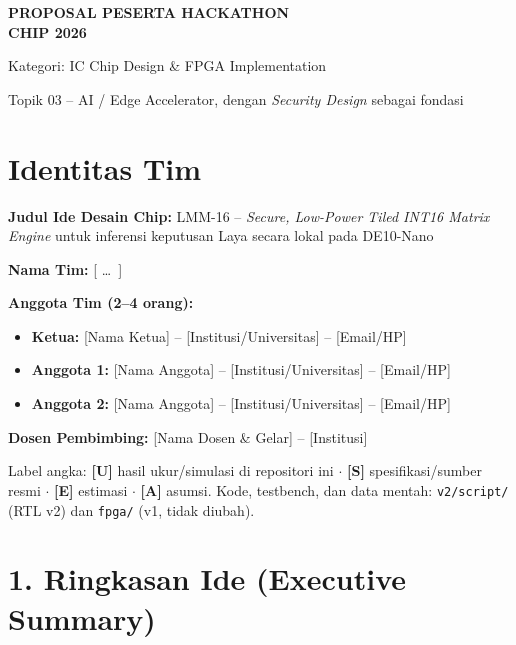 \documentclass[10pt]{article}
\begin{document}
{\fontsize{25}{29}\selectfont\bfseries PROPOSAL PESERTA HACKATHON\\ CHIP 2026\par}
\vspace{1mm}
{\color{mut}\Large Kategori: IC Chip Design \& FPGA Implementation\par}
{\color{mut}\small Topik 03 -- AI / Edge Accelerator, dengan \emph{Security Design} sebagai fondasi\par}

\section*{Identitas Tim}
\textbf{Judul Ide Desain Chip:} LMM-16 -- \emph{Secure, Low-Power Tiled INT16 Matrix Engine} untuk inferensi keputusan Laya secara lokal pada DE10-Nano

\textbf{Nama Tim:} [ \dots\ ]

\textbf{Anggota Tim (2--4 orang):}
\begin{itemize}
\item \textbf{Ketua:} [Nama Ketua] -- [Institusi/Universitas] -- [Email/HP]
\item \textbf{Anggota 1:} [Nama Anggota] -- [Institusi/Universitas] -- [Email/HP]
\item \textbf{Anggota 2:} [Nama Anggota] -- [Institusi/Universitas] -- [Email/HP]
\end{itemize}
\textbf{Dosen Pembimbing:} [Nama Dosen \& Gelar] -- [Institusi]

{\color{mut}\small Label angka: \textbf{[U]} hasil ukur/simulasi di repositori ini $\cdot$ \textbf{[S]} spesifikasi/sumber resmi $\cdot$ \textbf{[E]} estimasi $\cdot$ \textbf{[A]} asumsi. Kode, testbench, dan data mentah: \texttt{v2/script/} (RTL v2) dan \texttt{fpga/} (v1, tidak diubah).}

\section{1. Ringkasan Ide (Executive Summary)}
\end{document}
